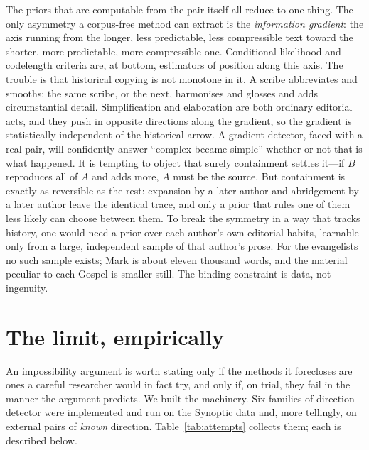 \documentclass[11pt,letterpaper]{article}
\begin{document}
The priors that are computable from the pair itself all reduce to one thing. The only asymmetry a corpus-free method can extract is the \emph{information gradient}: the axis running from the longer, less predictable, less compressible text toward the shorter, more predictable, more compressible one. Conditional-likelihood and codelength criteria are, at bottom, estimators of position along this axis. The trouble is that historical copying is not monotone in it. A scribe abbreviates and smooths; the same scribe, or the next, harmonises and glosses and adds circumstantial detail. Simplification and elaboration are both ordinary editorial acts, and they push in opposite directions along the gradient, so the gradient is statistically independent of the historical arrow. A gradient detector, faced with a real pair, will confidently answer ``complex became simple'' whether or not that is what happened. It is tempting to object that surely containment settles it---if $B$ reproduces all of $A$ and adds more, $A$ must be the source. But containment is exactly as reversible as the rest: expansion by a later author and abridgement by a later author leave the identical trace, and only a prior that rules one of them less likely can choose between them. To break the symmetry in a way that tracks history, one would need a prior over each author's own editorial habits, learnable only from a large, independent sample of that author's prose. For the evangelists no such sample exists; Mark is about eleven thousand words, and the material peculiar to each Gospel is smaller still. The binding constraint is data, not ingenuity.

\section{The limit, empirically}
\label{sec:empirical}

An impossibility argument is worth stating only if the methods it forecloses are ones a careful researcher would in fact try, and only if, on trial, they fail in the manner the argument predicts. We built the machinery. Six families of direction detector were implemented and run on the Synoptic data and, more tellingly, on external pairs of \emph{known} direction. Table~\ref{tab:attempts} collects them; each is described below.
\end{document}
